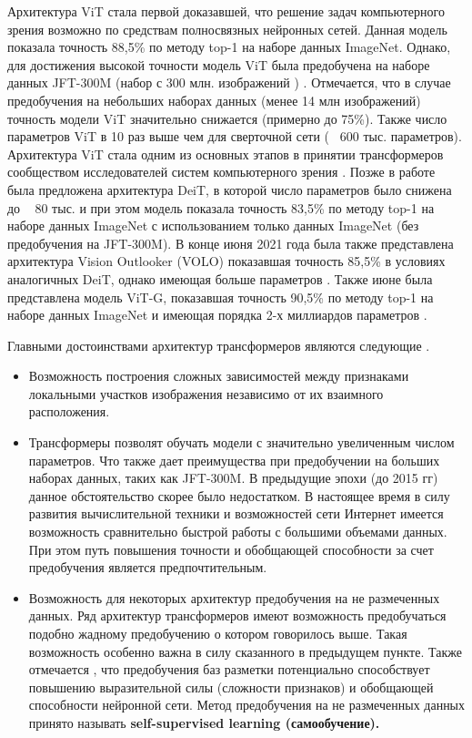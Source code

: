 \documentclass[12pt]{article}
\begin{document}
\begin{sloppypar}
Архитектура ViT стала первой доказавшей, что решение задач компьютерного зрения возможно по средствам полносвязных нейронных сетей. Данная модель показала точность 88,5\% по методу top-1 на наборе данных ImageNet. Однако, для достижения высокой точности модель ViT была предобучена на наборе данных JFT-300M (набор с 300 млн. изображений \cite{sun2017revisiting}) \cite{dosovitskiy2020image}. Отмечается, что в случае предобучения на небольших наборах данных (менее 14 млн изображений) точность модели ViT значительно снижается (примерно до 75\%). Также число параметров ViT в 10 раз выше чем для сверточной сети (~ 600 тыс. параметров). Архитектура ViT стала одним из основных этапов в принятии трансформеров сообществом исследователей систем компьютерного зрения \cite{khan2021transformers}. Позже в работе \cite{touvron2021training} была предложена архитектура DeiT, в которой число параметров было снижена до ~ 80 тыс. и при этом модель показала точность 83,5\% по методу top-1 на наборе данных ImageNet с использованием только данных ImageNet (без предобучения на JFT-300M). В конце июня 2021 года была также представлена архитектура Vision Outlooker (VOLO) показавшая точность 85,5\% в условиях аналогичных  DeiT, однако имеющая больше параметров \cite{yuan2021volo}. Также июне была представлена модель ViT-G, показавшая точность 90,5\% по методу top-1 на наборе данных ImageNet и имеющая порядка 2-х миллиардов параметров \cite{zhai2021scaling}.

Главными достоинствами архитектур трансформеров являются следующие \cite{khan2021transformers, han2020survey}.
\begin{itemize} \itemsep 0.2em 
    \item Возможность построения сложных зависимостей между признаками локальными участков изображения независимо от их взаимного расположения. 
    \item Трансформеры позволят обучать модели с значительно увеличенным числом параметров. Что также дает преимущества при предобучении на больших наборах данных, таких как JFT-300M. В предыдущие эпохи (до 2015 гг) данное обстоятельство скорее было недостатком. В настоящее время в силу развития вычислительной техники и возможностей сети Интернет имеется возможность сравнительно быстрой работы с большими объемами данных. При этом путь повышения точности и обобщающей способности за счет предобучения является предпочтительным.
    \item Возможность для некоторых архитектур предобучения на не размеченных данных. Ряд архитектур трансформеров имеют возможность предобучаться подобно жадному предобучению о котором говорилось выше. Такая возможность особенно важна в силу сказанного в предыдущем пункте. Также отмечается \cite{gidaris2018unsupervised, jing2020self}, что предобучения баз разметки потенциально способствует повышению выразительной силы (сложности признаков) и обобщающей способности нейронной сети. Метод предобучения на не размеченных данных принято называть \textbf{self-supervised learning (самообучение).} 
\end{itemize}


\end{sloppypar}
\end{document}
